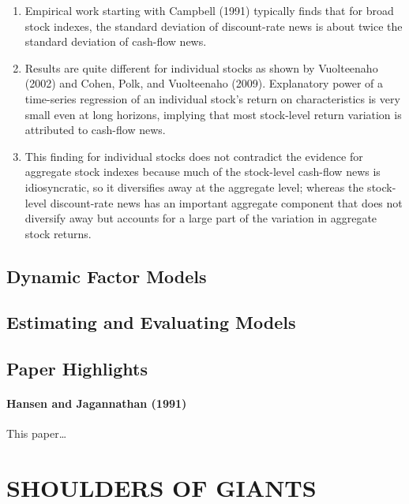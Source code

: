 \documentclass[
]{book}
\begin{document}
\begin{enumerate}
\def\labelenumi{\arabic{enumi}.}
\item
  Empirical work starting with Campbell (1991) typically finds that for broad stock indexes, the standard deviation of discount-rate news is about twice the standard deviation of cash-flow news.
\item
  Results are quite different for individual stocks as shown by Vuolteenaho (2002) and Cohen, Polk, and Vuolteenaho (2009). Explanatory power of a time-series regression of an individual stock's return on characteristics is very small even at long horizons, implying that most stock-level return variation is attributed to cash-flow news.
\item
  This finding for individual stocks does not contradict the evidence for aggregate stock indexes because much of the stock-level cash-flow news is idiosyncratic, so it diversifies away at the aggregate level; whereas the stock-level discount-rate news has an important aggregate component that does not diversify away but accounts for a large part of the variation in aggregate stock returns.
\end{enumerate}

\hypertarget{dynamic-factor-models}{%
\chapter{Dynamic Factor Models}\label{dynamic-factor-models}}

\hypertarget{estimating-and-evaluating-models}{%
\chapter{Estimating and Evaluating Models}\label{estimating-and-evaluating-models}}

\hypertarget{paper-highlights}{%
\chapter{Paper Highlights}\label{paper-highlights}}

\hypertarget{hansen-and-jagannathan-1991}{%
\subsection{Hansen and Jagannathan (1991)}\label{hansen-and-jagannathan-1991}}

This paper\ldots{}

\hypertarget{part-shoulders-of-giants}{%
\part*{SHOULDERS OF GIANTS}\label{part-shoulders-of-giants}}
\end{document}
